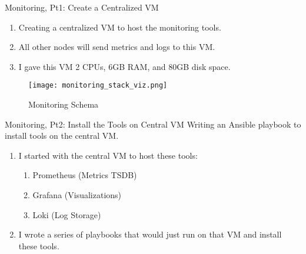 \documentclass[14pt,compress,usenames,dvipsnames,aspectratio=169]{beamer}
\begin{document}
\begin{frame}{Monitoring, Pt1: Create a Centralized VM}
    \begin{enumerate}
        \item{Creating a centralized VM to host the monitoring tools.} 
        \item{All other nodes will send metrics and logs to this VM.}
        \item{I gave this VM 2 CPUs, 6GB RAM, and 80GB disk space.}
    \end{enumerate}
    \begin{figure}
        \centering
        \texttt{[image: monitoring\_stack\_viz.png]}
        \caption{Monitoring Schema}
        \label{fig:enter-label}
    \end{figure} 
\end{frame}


\begin{frame}{Monitoring, Pt2: Install the Tools on Central VM}
    Writing an Ansible playbook to install tools on the central VM.
    \begin{enumerate}
        \item{I started with the central VM to host these tools:} 
            \begin{enumerate}
                \item{Prometheus (Metrics TSDB)}
                \item{Grafana (Visualizations)}
                \item{Loki (Log Storage)}
            \end{enumerate}
        \item{I wrote a series of playbooks that would just run on that VM and install these tools.}
    \end{enumerate}
\end{frame}
\end{document}
